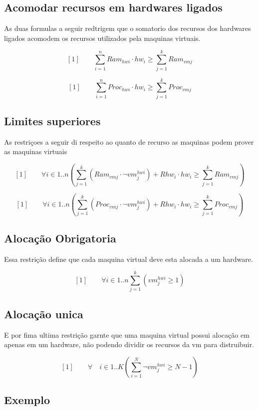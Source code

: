 \subsection{Acomodar recursos em hardwares ligados}

As duas formulas a seguir redtrigem que o somatorio dos recursos dos hardwares ligados acomodem os recursos utilizados pela maquinas virtuais.

$$[1] \qquad \sum_{i=1}^{n} Ram_{hwi} \cdot hw_{i} \geq \sum_{j=1}^{k} Ram_{vmj} $$

$$[1] \qquad \sum_{i=1}^{n} Proc_{hwi} \cdot hw_{i} \geq \sum_{j=1}^{k} Proc_{vmj} $$

\subsection{Limites superiores}

As restriçoes a seguir di respeito ao quanto de recurso as maquinas podem prover as maquinas virtuais


$$[1] \qquad \forall i \in 1..n (\sum_{j=1}^{k} (Ram_{vmj} \cdot \lnot{vm_{j}^{hwi}}) + Rhw_{i} \cdot hw_i \geq \sum_{j=1}^{k} Ram_{vmj})$$

$$[1] \qquad \forall i \in 1..n (\sum_{j=1}^{k} (Proc_{vmj} \cdot \lnot{vm_{j}^{hwi}}) + Rhw_{i} \cdot hw_i \geq \sum_{j=1}^{k} Proc_{vmj})$$

\subsection{Alocação Obrigatoria}

Essa restrição define que cada maquina virtual deve esta alocada a um hardware.

$$[1] \qquad \forall i \in 1..n  \sum_{j=1}^{k} (vm_j^{hwi} \geq 1)$$

\subsection{Alocação unica}

E por fima ultima restrição garnte que uma maquina virtual possui alocação em apenas em um hardware, não podendo dividir os recursos da vm para distruibuir.

$$[1] \qquad \forall \quad i  \in 1..K (\sum_{i=1}^{N} \lnot{vm_j^{hwi}} \geq N - 1)$$

\subsection{Exemplo}

